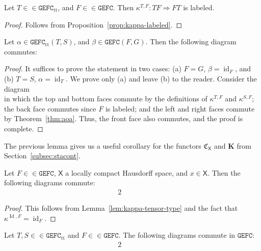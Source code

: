 \documentclass[10pt]{simplearticle}
\newcommand{\tikzinput}[1]{}
\newcommand{\id}{\operatorname{id}}
\newcommand{\Id}{\operatorname{Id}}
\newcommand{\GEFC}{\mathbb{\mathtt{GEFC}}}
\newcommand{\C}{\mathfrak{C}^{\,}}
\newcommand{\fK}{\mathbf{K}}
\newcommand{\ttt}{\operatorname{tt}}
\begin{document}
\begin{lem}
Let $T\in\in\GEFC_{\ttt}$, and $F\in\in\GEFC$. Then $\kappa^{T,F}\colon TF\Rightarrow FT$
is labeled.
\end{lem}

\begin{proof}
Follows from Proposition~\ref{prop:kappa-labeled}.
\end{proof}

\begin{lem}\label{lem:kappa-tensor-type}
Let $\alpha\in\GEFC_{\ttt}(T,S)$, and
$\beta\in\GEFC(F,G)$. Then the following diagram commutes:
\[
\tikzinput{d385}
\]
\end{lem}

\begin{proof}
It suffices to prove the statement in two cases: (a) $F=G$, $\beta=\id_{F}$,
and (b) $T=S$, $\alpha=\id_{T}$. We prove only (a) and leave (b)
to the reader. Consider the diagram
\[
\tikzinput{d417}
\]
in which the top and bottom faces commute by the definitions of $\kappa^{T,F}$
and $\kappa^{S,F}$; the back face commutes since $F$ is labeled;
and the left and right faces commute by Theorem~\ref{thm:aoa}. Thus,
the front face also commutes, and the proof is complete.
\end{proof}

The previous lemma gives us a useful corollary for the functors $\C_{\mathsf{X}}$
and $\fK$ from Section~\ref{subsec:stacont}.
\begin{cor}\label{cor:332}
Let $F\in\in\GEFC$, $\mathsf{X}$ a locally compact
Hausdorff space, and $x\in\mathsf{X}$. Then the following diagrams
commute:
\begin{alignat}{2}
\tikzinput{d273} & \qquad & \tikzinput{d354}\label{eq:d273}
\end{alignat}
\end{cor}

\begin{proof}
This follows from Lemma~\ref{lem:kappa-tensor-type} and the fact
that $\kappa^{\Id,F}=\id_{F}$.
\end{proof}

\begin{prop}\label{prop:kappa-prop}
Let $T,S\in\in\GEFC_{\ttt}$ and $F\in\in\GEFC$.
The following diagrams commute in $\GEFC$:
\begin{alignat*}{2}
\tikzinput{d397} & \qquad & \tikzinput{d396}
\end{alignat*}
\end{prop}
\end{document}

